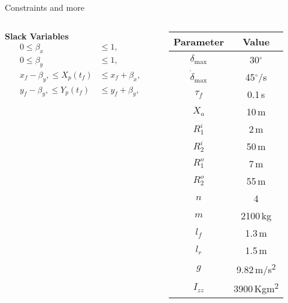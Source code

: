 \begin{frame}{Constraints and more}
\begin{columns}
\begin{column}{0.3\textwidth}
            \vspace{10pt}
            \textbf{Slack Variables}
            \begin{align*}
                0 \leq \beta_x &\leq 1,\\
                0 \leq \beta_y &\leq 1,\\
                x_f - \beta_y, \leq X_p(t_f) &\leq x_f + \beta_x,\\
                y_f - \beta_y, \leq Y_p(t_f) &\leq y_f + \beta_y,
            \end{align*}
        \end{column}
        \begin{column}{0.2\textwidth}
            \begin{tabular}{c|c}
                Parameter & Value \\
                \hline
                $\delta_{\text{max}}$ & 30$^\circ$ \\
                $\dot \delta_{\text{max}}$ & 45$^\circ$/s\\
                $\tau_f$ & 0.1\,s\\
                $X_a$ & 10\,m\\
                $R_1^i$ & 2\,m\\
                $R_2^i$ & 50\,m\\
                $R_1^o$ & 7\,m\\
                $R_2^o$ & 55\,m\\
                $n$ & 4\\
                \hline
                $m$ & 2100\,kg\\
                $l_f$ & 1.3\,m\\
                $l_r$ & 1.5\,m\\
                $g$ & 9.82\,m/s\textsuperscript{2}\\
                $I_{zz}$ & 3900\,Kgm\textsuperscript{2}\\
            \end{tabular}
        \end{column}
    \end{columns}
\end{frame}